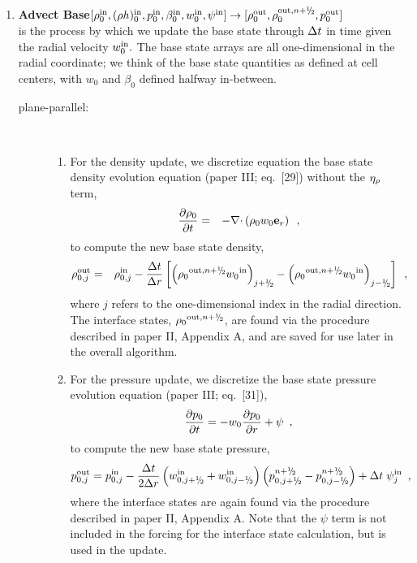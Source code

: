 \begin{enumerate}
\item {\bf Advect Base}$[\rho_0^{\inp}, (\rho h)_0^{\inp}, p_0^{\inp}, \beta_0^{\inp}, w_0^{\inp}, \psi^{\inp}] \rightarrow [\rho_0^{\outp}, \rho_0^{\outp,n+\myhalf}, p_0^{\outp}]$ \\
is the process by which we update the base state through $\Delta t$ in
time  given the
radial velocity $w_0^{\mathrm{in}}.$ The base state arrays are all
one-dimensional in the radial coordinate; we think of the base state
quantities as defined at cell centers, with $w_0$ and $\beta_0$
defined halfway in-between.

\begin{description}

\item[plane-parallel:] ~

\begin{enumerate}
\renewcommand{\labelenumii}{{\bf \alph{enumii}}.}

\item For the density update, we discretize equation the base state
  density evolution equation (paper III; eq.~[29]) without the $\eta_{\rho}$ term,
\begin{eqnarray}
\frac{\partial \rho_0}{\partial t} &=& - \mathbf{\nabla} \mathbf{\cdot} \left( \rho_0 w_0 \mathbf{e}_r \right)
\enskip ,
\label{eq:rho0upd_new}
\end{eqnarray}
to compute the new base state density,
\begin{eqnarray}
\rho_{0,j}^{\outp} &=& \rho_{0,j}^{\inp} - \frac{\dt}{\dr} 
\left [ \left( {{\rho}_0}^{\outp,\nph} {w_0}^{\inp}\right)_{j+\myhalf} -  
         \left( {{\rho}_0}^{\outp,\nph} {w_0}^{\inp}\right)_{j-\myhalf} \right ]
         \nonumber \enskip,
\end{eqnarray}
where $j$ refers to the one-dimensional index in the radial direction.
The interface states, ${{\rho}_0}^{\outp,\nph}$, are found via the
procedure described in paper II, Appendix A, and are saved for use
later in the overall algorithm.

\item For the pressure update, we discretize the base state pressure
  evolution equation (paper III; eq.~[31]),
\begin{equation}
\frac{\partial p_0}{\partial t} = 
-w_0 \frac{\partial p_0}{\partial r} + \psi \enskip ,
\label{eq:p0upd_new}
\end{equation}
to compute the new base state pressure,
\begin{equation}
p_{0,j}^\outp = p_{0,j}^\inp - \frac{\dt}{2\dr} \left (w_{0,j+\myhalf}^\inp
+ w_{0,j-\myhalf}^\inp \right)
\left (p_{0,j+\myhalf}^{n+\myhalf} -p_{0,j-\myhalf}^{n+\myhalf} \right ) + \dt \; \psi_j^\inp 
\enskip,
\end{equation}
where the interface states are again found via the procedure described
in paper II, Appendix A.  Note that the $\psi$ term is not included in the forcing for
the interface state calculation, but is used in the update.


\end{enumerate}
\end{description}
\end{enumerate}
